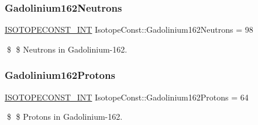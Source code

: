 \subsubsection{\texorpdfstring{Gadolinium162\+Neutrons}{Gadolinium162Neutrons}}
{\footnotesize\ttfamily \mbox{\hyperlink{group___isotope_const-_macros_ga5f18360b3e99483a35c32d789e62621c}{I\+S\+O\+T\+O\+P\+E\+C\+O\+N\+S\+T\+\_\+\+I\+NT}} Isotope\+Const\+::\+Gadolinium162\+Neutrons = 98}

\$ \$ Neutrons in Gadolinium-\/162. \mbox{\label{group___isotope_const-_gadolinium-_gd162_ga6e4623aa67d0865a914bf2d5ccf7f791}} 
\subsubsection{\texorpdfstring{Gadolinium162\+Protons}{Gadolinium162Protons}}
{\footnotesize\ttfamily \mbox{\hyperlink{group___isotope_const-_macros_ga5f18360b3e99483a35c32d789e62621c}{I\+S\+O\+T\+O\+P\+E\+C\+O\+N\+S\+T\+\_\+\+I\+NT}} Isotope\+Const\+::\+Gadolinium162\+Protons = 64}

\$ \$ Protons in Gadolinium-\/162. 